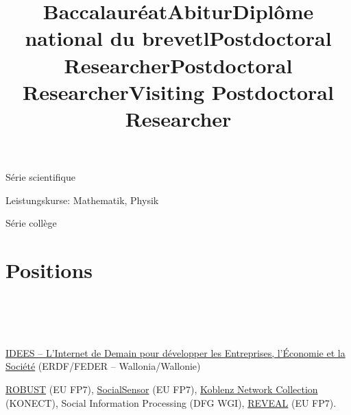 \documentclass[line,margin]{res}
\newcounter{x}
\begin{document}
\begin{resume}
\title{\bf Baccalauréat}
\begin{position}
  Série scientifique
\end{position}

\title{\bf Abitur}
\begin{position}
  Leistungskurse:  Mathematik, Physik
\end{position}

\title{\bf Diplôme national du brevet}
\begin{position}
  Série collège
\end{position}

\section{Positions}

\begin{format}
\title{l}\\
 \\
\body\\
\end{format}

\title{\bf Postdoctoral Researcher}
\begin{position}
  \href{http://nouvelles.unamur.be/upnews.2015-10-01.8995593781}{IDEES -- L'Internet de Demain pour développer les Entreprises, l'Économie et la Société} (ERDF/FEDER -- Wallonia/Wallonie)
\end{position}

\title{\bf Postdoctoral Researcher}
\begin{position}
  \href{http://www.robust-project.eu/}{ROBUST} (EU FP7), \href{http://www.socialsensor.eu/}{SocialSensor} (EU FP7), \href{http://konect.uni-koblenz.de/}{Koblenz Network Collection} (KONECT), Social Information Processing (DFG WGI), \href{http://revealproject.eu/}{REVEAL} (EU FP7).
\end{position}

\title{\bf Visiting Postdoctoral Researcher}
\begin{position}
\end{position}


\end{resume}
\end{document}
